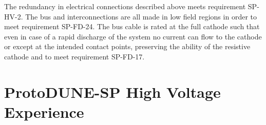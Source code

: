 The redundancy in electrical connections described above meets requirement SP-HV-2. %
The  bus and interconnections are all made in low field regions in order to meet requirement SP-FD-24.
The  bus cable is rated at the full cathode  such that even in case of a rapid discharge of the  system no current can flow to the cathode or  except at the intended contact points, preserving the ability of the resistive cathode and  to meet requirement SP-FD-17.


\section{ProtoDUNE-SP High Voltage Experience}
\label{sec:fdsp-hv-protodune}



